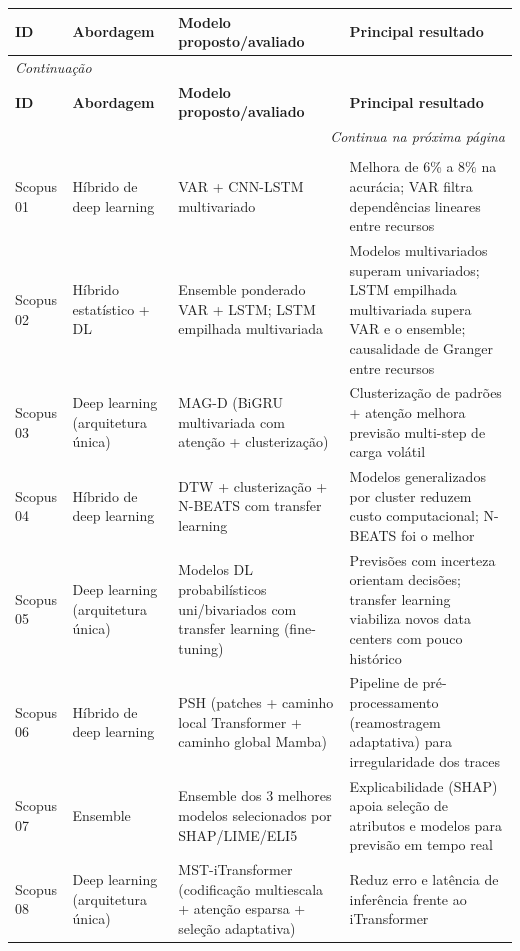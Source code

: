 {\footnotesize
\setlength{\tabcolsep}{3pt}
\renewcommand{\arraystretch}{1.15}
\begin{longtable}{p{1.3cm}p{2.6cm}p{5.0cm}p{5.9cm}}
\toprule
\textbf{ID} & \textbf{Abordagem} & \textbf{Modelo proposto/avaliado} & \textbf{Principal resultado} \\
\midrule
\endfirsthead
\multicolumn{4}{l}{\textit{Continuação}}\\
\toprule
\textbf{ID} & \textbf{Abordagem} & \textbf{Modelo proposto/avaliado} & \textbf{Principal resultado} \\
\midrule
\endhead
\midrule
\multicolumn{4}{r}{\textit{Continua na próxima página}}\\
\endfoot
\bottomrule
\multicolumn{4}{l}{Fonte: Elaborado pelo autor (2026).}\\
\endlastfoot
Scopus 01 & Híbrido de deep learning & VAR + CNN-LSTM multivariado & Melhora de 6\% a 8\% na acurácia; VAR filtra dependências lineares entre recursos \\
Scopus 02 & Híbrido estatístico + DL & Ensemble ponderado VAR + LSTM; LSTM empilhada multivariada & Modelos multivariados superam univariados; LSTM empilhada multivariada supera VAR e o ensemble; causalidade de Granger entre recursos \\
Scopus 03 & Deep learning (arquitetura única) & MAG-D (BiGRU multivariada com atenção + clusterização) & Clusterização de padrões + atenção melhora previsão multi-step de carga volátil \\
Scopus 04 & Híbrido de deep learning & DTW + clusterização + N-BEATS com transfer learning & Modelos generalizados por cluster reduzem custo computacional; N-BEATS foi o melhor \\
Scopus 05 & Deep learning (arquitetura única) & Modelos DL probabilísticos uni/bivariados com transfer learning (fine-tuning) & Previsões com incerteza orientam decisões; transfer learning viabiliza novos data centers com pouco histórico \\
Scopus 06 & Híbrido de deep learning & PSH (patches + caminho local Transformer + caminho global Mamba) & Pipeline de pré-processamento (reamostragem adaptativa) para irregularidade dos traces \\
Scopus 07 & Ensemble & Ensemble dos 3 melhores modelos selecionados por SHAP/LIME/ELI5 & Explicabilidade (SHAP) apoia seleção de atributos e modelos para previsão em tempo real \\
Scopus 08 & Deep learning (arquitetura única) & MST-iTransformer (codificação multiescala + atenção esparsa + seleção adaptativa) & Reduz erro e latência de inferência frente ao iTransformer \\

\end{longtable}}
